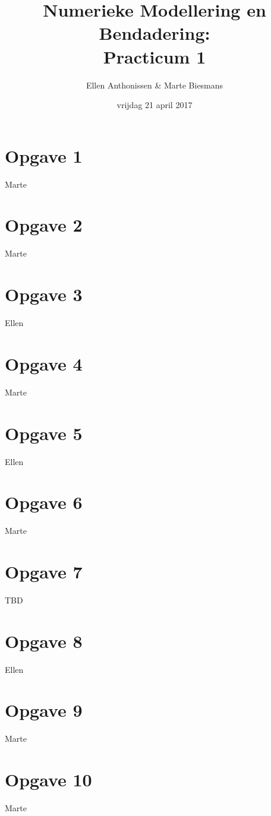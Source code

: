 \documentclass[a4paper]{article}
\title{Numerieke Modellering en Bendadering:\\
	Practicum 1}
\author{Ellen Anthonissen & Marte Biesmans}
\date{vrijdag 21 april 2017}
\newcommand{\opgave}[1]{\section*{Opgave #1}}
\begin{document}
\maketitle
\opgave{1}
Marte

\opgave{2}
Marte

\opgave{3}
Ellen

\opgave{4}
Marte

\opgave{5}
Ellen

\opgave{6}
Marte

\opgave{7}
TBD

\opgave{8}
Ellen

\opgave{9}
Marte

\opgave{10}
Marte
\end{document}
